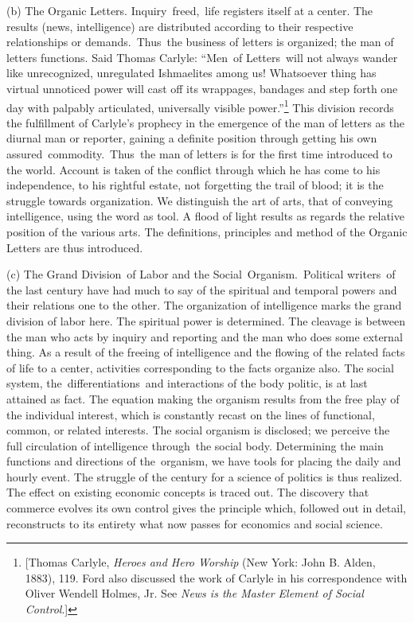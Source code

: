\documentclass[openany,nobib]{tufte-book}
\begin{document}
\begin{hangparas}{.25in}{1}
(b) The Organic Letters. Inquiry~freed,~life registers itself at a
center. The results (news, intelligence) are distributed according to
their respective relationships or demands.~Thus~the business of letters
is organized; the man of letters functions. Said Thomas Carlyle:
``Men~of Letters~will not always wander like unrecognized, unregulated
Ishmaelites among us! Whatsoever thing has virtual unnoticed power will
cast off its wrappages, bandages and step forth one day with palpably
articulated, universally visible power.''\footnote{{[}Thomas Carlyle,
  \emph{Heroes and Hero Worship} (New York: John B. Alden, 1883), 119.
  Ford also discussed the work of Carlyle in his correspondence with
  Oliver Wendell Holmes, Jr. See \emph{News is the Master Element of
  Social Control}.{]}} This division records the fulfillment of
Carlyle's prophecy in the emergence of the man of letters as the diurnal
man or reporter, gaining a definite position through getting his own
assured~commodity.~Thus~the man of letters is for the first time
introduced to the world. Account is taken of the conflict through which
he has come to his independence, to his rightful estate, not forgetting
the trail of blood; it is the struggle towards organization. We
distinguish the art of arts, that of conveying intelligence, using the
word as tool. A flood of light results as regards the relative position
of the various arts. The definitions, principles and method of the
Organic Letters are thus introduced.~

(c) The Grand Division~of Labor and the Social~Organism.~Political
writers~of the last century have had much to say of the spiritual and
temporal powers and their relations one to the other. The organization
of intelligence marks the grand division of labor here. The spiritual
power is determined. The cleavage is between the man who acts by inquiry
and reporting and the man who does some external thing. As a result of
the freeing of intelligence and the flowing of the related facts of life
to a center, activities corresponding to the facts organize also. The
social system, the~differentiations~and interactions of the body
politic, is at last attained as fact. The equation making the organism
results from the free play of the individual interest, which is
constantly recast on the lines of functional, common, or related
interests. The social organism is disclosed; we perceive the full
circulation of intelligence through~the social body. Determining the
main functions and directions of the~organism, we have tools for placing
the daily and hourly event. The struggle of the century for a science of
politics is thus realized. The effect on existing economic concepts is
traced out. The discovery that commerce evolves its own control gives
the principle which, followed out in detail, reconstructs to its
entirety what now passes for economics and social science. ~


\end{hangparas}
\end{document}
